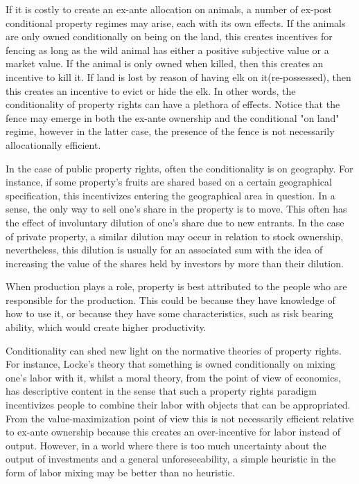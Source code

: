 If it is costly to create an ex-ante allocation on animals, a number of ex-post conditional property regimes may arise, each with its own effects. If the animals are only owned conditionally on being on the land, this creates incentives for fencing as long as the wild animal has either a positive subjective value or a market value. If the animal is only owned when killed, then this creates an incentive to kill it. If land is lost by reason of having elk on it(re-possessed), then this creates an incentive to evict or hide the elk. In other words, the conditionality of property rights can have a plethora of effects. Notice that the fence may emerge in both the ex-ante ownership and the conditional "on land" regime, however in the latter case, the presence of the fence is not necessarily allocationally efficient. 


In the case of public property rights, often the conditionality is on geography. For instance, if some property's fruits are shared based on a certain geographical specification, this incentivizes entering the geographical area in question. In a sense, the only way to sell one's share in the property is to move. This often has the effect of involuntary dilution of one's share due to new entrants. In the case of private property, a similar dilution may occur in relation to stock ownership, nevertheless, this dilution is usually for an associated sum with the idea of increasing the value of the shares held by investors by more than their dilution.

When production plays a role, property is best attributed to the people who are responsible for the production. This could be because they have knowledge of how to use it, or because they have some characteristics, such as risk bearing ability, which would create higher productivity.

Conditionality can shed new light on the normative theories of property rights. For instance, Locke's theory that something is owned conditionally on mixing one's labor with it, whilst a moral theory, from the point of view of economics, has descriptive content in the sense that such a property rights paradigm incentivizes people to combine their labor with objects that can be appropriated. From the value-maximization point of view this is not necessarily efficient relative to ex-ante ownership because this creates an over-incentive for labor instead of output. However, in a world where there is too much uncertainty about the output of investments and a general unforeseeability, a simple heuristic in the form of labor mixing may be better than no heuristic. 

